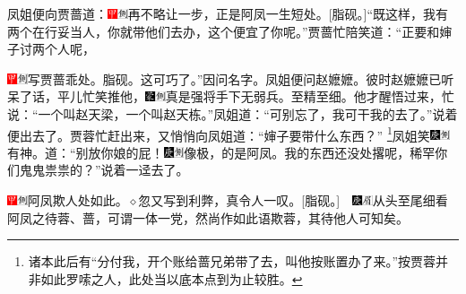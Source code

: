 {{{{{{{凤姐便向贾蔷道：{{\includegraphics[width=3mm]{../Images/00002}\includegraphics[width=3mm]{../Images/00011}\footnotesize \kaishu 再不略让一步，正是阿凤一生短处。[脂砚。]}}“既这样，我有两个在行妥当人，你就带他们去办，这个便宜了你呢。”贾蔷忙陪笑道：“正要和婶子讨两个人呢，{{\includegraphics[width=3mm]{../Images/00002}\includegraphics[width=3mm]{../Images/00011}\footnotesize \kaishu 写贾蔷乖处。脂砚。}这可巧了。”因问名字。凤姐便问赵嬷嬷。彼时赵嬷嬷已听呆了话，平儿忙笑推他，{\includegraphics[width=3mm]{../Images/00006}\includegraphics[width=3mm]{../Images/00011}\footnotesize \kaishu 真是强将手下无弱兵。至精至细。}他才醒悟过来，忙说：“一个叫赵天梁，一个叫赵天栋。”凤姐道：“可别忘了，我可干我的去了。”说着便出去了。贾蓉忙赶出来，又悄悄向凤姐道：“婶子要带什么东西？”
\footnote{诸本此后有“分付我，开个账给蔷兄弟带了去，叫他按账置办了来。”按贾蓉并非如此罗嗦之人，此处当以底本点到为止较胜。}凤姐笑{\includegraphics[width=3mm]{../Images/00004}\includegraphics[width=3mm]{../Images/00011}\footnotesize \kaishu 有神。}道：“别放你娘的屁！{\includegraphics[width=3mm]{../Images/00004}\includegraphics[width=3mm]{../Images/00011}\footnotesize \kaishu 像极，的是阿凤。}我的东西还没处撂呢，稀罕你们鬼鬼祟祟的？”说着一迳去了。{{\includegraphics[width=3mm]{../Images/00002}\includegraphics[width=3mm]{../Images/00011}\footnotesize \kaishu 阿凤欺人处如此。{$\diamond$}忽又写到利弊，真令人一叹。[脂砚。]{　\includegraphics[width=3mm]{../Images/00004}\includegraphics[width=3mm]{../Images/00010}\footnotesize \kaishu 从头至尾细看阿凤之待蓉、蔷，可谓一体一党，然尚作如此语欺蓉，其待他人可知矣。}}

}}}}}}}}}
